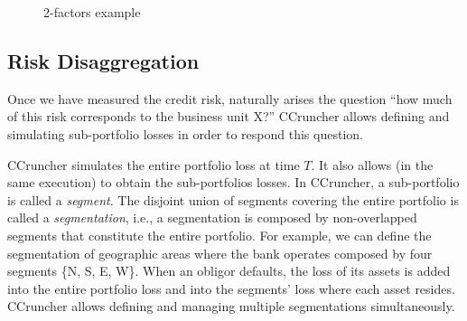 \documentclass[11pt,fleqn]{book} %
\begin{document}
\begin{figure}[!ht]
	\centering
	\hfill
	\caption{2-factors example}
	\label{fig:test05}
\end{figure}

\subsection{Risk Disaggregation}
\label{ss:ra}

Once we have measured the credit risk, naturally arises the question 
``how much of this risk corresponds to the business unit X?'' CCruncher
allows defining and simulating sub-portfolio losses in order to respond
this question.

CCruncher simulates the entire portfolio loss at time $T$. It also allows 
(in the same execution) to obtain the sub-portfolios losses. In CCruncher, 
a sub-portfolio is called a \emph{segment}. The disjoint union of segments 
covering the entire portfolio is called a \emph{segmentation}, i.e., a 
segmentation is composed by non-overlapped segments that constitute the 
entire portfolio. For example, we can define the segmentation of geographic
areas where the bank operates composed by four segments \{N, S, E, W\}.
When an obligor defaults, the loss of its assets is added into the 
entire portfolio loss and into the segments' loss where each asset resides.
CCruncher allows defining and managing multiple segmentations simultaneously. 
\end{document}

